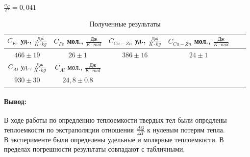 \documentclass[a4paper]{article}
\begin{document}
	$\frac{\sigma _C}{C} = 0,041$
	\begin{table}[h!]
 		\centering
	\begin{tabular}{|c|c|c|c|c|c|}
		\hline
		$C_{Fe}$ уд., $\frac{\text{Дж}}{K\cdot kg}$ & $C_{Fe}$ мол., $\frac{\text{Дж}}{K\cdot mol}$ & $C_{Cu-Zn}$ уд., $\frac{\text{Дж}}{K\cdot kg}$ & $C_{Cu-Zn}$ мол., $\frac{\text{Дж}}{K\cdot mol}$ \\
		\hline
		$466 \pm 19$ & $26 \pm 1$ & $386 \pm 16$ & $24 \pm 1$ \\
		\hline
		$C_{Al}$ уд., $\frac{\text{Дж}}{K\cdot kg}$ & $C_{Al}$ мол., $\frac{\text{Дж}}{K\cdot mol}$ &&\\
		\hline
		 $930 \pm 30$ & $24,8 \pm 0.8$ &&\\
		 \hline
    	\end{tabular}
  		\caption{Полученные результаты}
	\end{table}

	\paragraph{Вывод:}
	В ходе работы по опредлению теплоемкости твердых тел были опредлены теплоемкости по экстраполяции отношения $\frac{\Delta Q}{\Delta T}$ к нулевым потерям тепла.\\
	В эксперименте были определены удельные и молярные теплоемкости. В пределах погрешности результаты совпадают с табличными.
\end{document}
